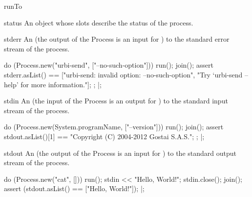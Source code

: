 \begin{urbiscriptapi}
\item[runTo]


\item[status] An object whose slots describe the status of the
  process.


\item[stderr] An  (the output of the Process is
  an input for \urbi) to the standard error stream of the process.
\begin{urbiunchecked}
do (Process.new("urbi-send", ["--no-such-option"]))
{
  run();
  join();
  assert
  {
    stderr.asList() ==
    ["urbi-send: invalid option: --no-such-option",
     "Try `urbi-send --help' for more information."];
  };
}|;
\end{urbiunchecked}


\item[stdin] An  (the input of the Process is
  an output for \urbi) to the standard input stream of the process.
\begin{urbiscript}
do (Process.new(System.programName, ["--version"]))
{
  run();
  join();
  assert
  {
    stdout.asList()[1] == "Copyright (C) 2004-2012 Gostai S.A.S.";
  };
}|;
\end{urbiscript}


\item[stdout] An  (the output of the Process is
  an input for \urbi) to the standard output stream of the process.
\begin{urbiscript}
do (Process.new("cat", []))
{
  run();
  stdin << "Hello, World!\n";
  stdin.close();
  join();
  assert (stdout.asList() == ["Hello, World!"]);
}|;
\end{urbiscript}
\end{urbiscriptapi}


